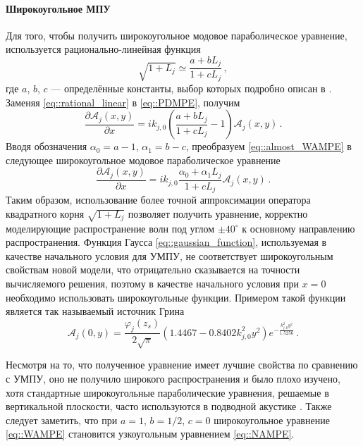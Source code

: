 \documentclass{fefu}
\newcommand{\pa}[1]{\left(#1\right)}
\begin{document}
                \paragraph{Широкоугольное МПУ}
                    \par Для того, чтобы получить широкоугольное модовое параболическое уравнение, используется рационально-линейная функция
                    \begin{equation}\label{eq::rational_linear}
                        \sqrt{1+L_j}\simeq\frac{a+bL_j}{1+cL_j}\,,
                    \end{equation}
                    где $a$, $b$, $c$ --- определённые константы, выбор которых подробно описан в \cite{jensen}. Заменяя \eqref{eq::rational_linear} в \eqref{eq::PDMPE}, получим
                    \begin{equation}\label{eq::almost_WAMPE}
                        \frac{\partial\mathcal{A}_j\pa{x,y}}{\partial x}=ik_{j,0}\pa{\frac{a+bL_j}{1+cL_j}-1}\mathcal{A}_j\pa{x,y}\,.
                    \end{equation}
                    Вводя обозначения $\alpha_0=a-1$, $\alpha_1=b-c$, преобразуем \eqref{eq::almost_WAMPE} в следующее широкоугольное модовое параболическое уравнение
                    \begin{equation}\label{eq::WAMPE}
                        \frac{\partial\mathcal{A}_j\pa{x,y}}{\partial x}=ik_{j,0}\frac{\alpha_0+\alpha_1L_j}{1+cL_j}\mathcal{A}_j\pa{x,y}\,.
                    \end{equation}
                    Таким образом, использование более точной аппроксимации оператора квадратного корня $\sqrt{1+L_j}$ позволяет получить уравнение, корректно моделирующие распространение волн под углом $\pm40^\circ$ к основному направлению распространения. Функция Гаусса \eqref{eq::gaussian_function}, используемая в качестве начального условия для УМПУ, не соответствует широкоугольным свойствам новой модели, что отрицательно сказывается на точности вычисляемого решения, поэтому в качестве начального условия при $x=0$ необходимо использовать широкоугольные функции. Примером такой функции является так называемый источник Грина \cite{jensen}
                    \begin{equation}\label{eq::greene_function}
                        \mathcal{A}_j\pa{0,y}=\frac{\varphi_j\pa{z_s}}{2\sqrt{\pi}}\pa{1.4467-0.8402k_{j,0}^2y^2}e^{-\frac{k_{j,0}^2y^2}{1.5256}}\,.
                    \end{equation}
                    \par Несмотря на то, что полученное уравнение имеет лучшие свойства по сравнению с УМПУ, оно не получило широкого распространения и было плохо изучено, хотя стандартные широкоугольные параболические уравнения, решаемые в вертикальной плоскости, часто используются в подводной акустике \cite{claerbout,jensen,greene}. Также следует заметить, что при $a=1$, $b=1/2$, $c=0$ широкоугольное уравнение \eqref{eq::WAMPE} становится узкоугольным уравнением \eqref{eq::NAMPE}.
\end{document}
